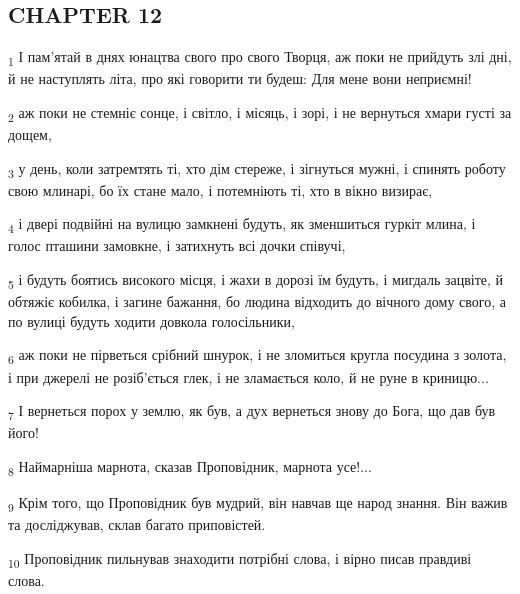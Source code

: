 \subsection{CHAPTER 12}
\begin{tcolorbox}
\textsubscript{1} І пам'ятай в днях юнацтва свого про свого Творця, аж поки не прийдуть злі дні, й не наступлять літа, про які говорити ти будеш: Для мене вони неприємні!
\end{tcolorbox}
\begin{tcolorbox}
\textsubscript{2} аж поки не стемніє сонце, і світло, і місяць, і зорі, і не вернуться хмари густі за дощем,
\end{tcolorbox}
\begin{tcolorbox}
\textsubscript{3} у день, коли затремтять ті, хто дім стереже, і зігнуться мужні, і спинять роботу свою млинарі, бо їх стане мало, і потемніють ті, хто в вікно визирає,
\end{tcolorbox}
\begin{tcolorbox}
\textsubscript{4} і двері подвійні на вулицю замкнені будуть, як зменшиться гуркіт млина, і голос пташини замовкне, і затихнуть всі дочки співучі,
\end{tcolorbox}
\begin{tcolorbox}
\textsubscript{5} і будуть боятись високого місця, і жахи в дорозі їм будуть, і мигдаль зацвіте, й обтяжіє кобилка, і загине бажання, бо людина відходить до вічного дому свого, а по вулиці будуть ходити довкола голосільники,
\end{tcolorbox}
\begin{tcolorbox}
\textsubscript{6} аж поки не пірветься срібний шнурок, і не зломиться кругла посудина з золота, і при джерелі не розіб'ється глек, і не зламається коло, й не руне в криницю...
\end{tcolorbox}
\begin{tcolorbox}
\textsubscript{7} І вернеться порох у землю, як був, а дух вернеться знову до Бога, що дав був його!
\end{tcolorbox}
\begin{tcolorbox}
\textsubscript{8} Наймарніша марнота, сказав Проповідник, марнота усе!...
\end{tcolorbox}
\begin{tcolorbox}
\textsubscript{9} Крім того, що Проповідник був мудрий, він навчав ще народ знання. Він важив та досліджував, склав багато приповістей.
\end{tcolorbox}
\begin{tcolorbox}
\textsubscript{10} Проповідник пильнував знаходити потрібні слова, і вірно писав правдиві слова.
\end{tcolorbox}
